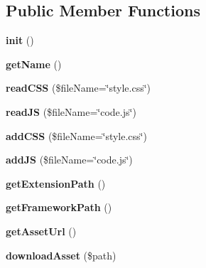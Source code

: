 \subsection*{Public Member Functions}
\begin{DoxyCompactItemize}
\item 
\hypertarget{class_extension_ad3506e3a68271ddf7002a18a9374b705}{
{\bfseries init} ()}
\label{class_extension_ad3506e3a68271ddf7002a18a9374b705}

\item 
\hypertarget{class_extension_aaff47cc73945bcd5b857d01c149ed76a}{
{\bfseries getName} ()}
\label{class_extension_aaff47cc73945bcd5b857d01c149ed76a}

\item 
\hypertarget{class_extension_a437959bf435ca57b15500017a457db31}{
{\bfseries readCSS} (\$fileName=\char`\"{}style.css\char`\"{})}
\label{class_extension_a437959bf435ca57b15500017a457db31}

\item 
\hypertarget{class_extension_ab6b2df0bd5c11a30c79a418aace755c4}{
{\bfseries readJS} (\$fileName=\char`\"{}code.js\char`\"{})}
\label{class_extension_ab6b2df0bd5c11a30c79a418aace755c4}

\item 
\hypertarget{class_extension_aa3e47aee2c17dfd60d7a59b5be104bcf}{
{\bfseries addCSS} (\$fileName=\char`\"{}style.css\char`\"{})}
\label{class_extension_aa3e47aee2c17dfd60d7a59b5be104bcf}

\item 
\hypertarget{class_extension_a0e7a1aca09bcb7897eb2a1ab0dc85039}{
{\bfseries addJS} (\$fileName=\char`\"{}code.js\char`\"{})}
\label{class_extension_a0e7a1aca09bcb7897eb2a1ab0dc85039}

\item 
\hypertarget{class_extension_ad4f1423d749cac1d0cdd78c5a7f0a407}{
{\bfseries getExtensionPath} ()}
\label{class_extension_ad4f1423d749cac1d0cdd78c5a7f0a407}

\item 
\hypertarget{class_extension_a79b2ea3a1eb04ad91142de8d67c2e04b}{
{\bfseries getFrameworkPath} ()}
\label{class_extension_a79b2ea3a1eb04ad91142de8d67c2e04b}

\item 
\hypertarget{class_extension_a73d88ee200162707cd9ac9a6c3c4d3bb}{
{\bfseries getAssetUrl} ()}
\label{class_extension_a73d88ee200162707cd9ac9a6c3c4d3bb}

\item 
\hypertarget{class_extension_ac001ec4d23f5d128021cd6d29b98ca14}{
{\bfseries downloadAsset} (\$path)}
\label{class_extension_ac001ec4d23f5d128021cd6d29b98ca14}

\end{DoxyCompactItemize}
